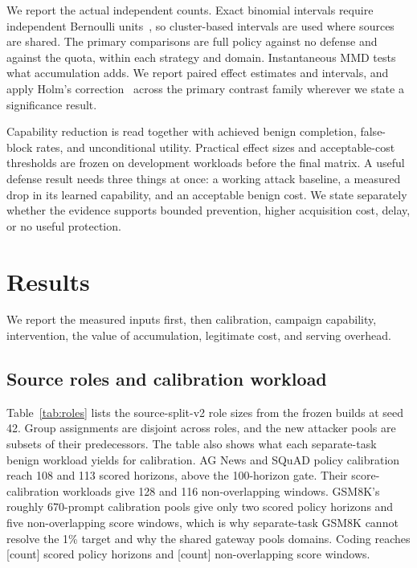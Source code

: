 \documentclass[journal]{IEEEtran}
\newcommand{\tbd}[1]{\textcolor{red!65!black}{[#1]}}
\begin{document}
We report the actual independent counts. Exact binomial intervals require independent Bernoulli units~\cite{clopper1934limits}, so cluster-based intervals are used where sources are shared. The primary comparisons are full policy against no defense and against the quota, within each strategy and domain. Instantaneous MMD tests what accumulation adds. We report paired effect estimates and intervals, and apply Holm's correction~\cite{holm1979simple} across the primary contrast family wherever we state a significance result.

Capability reduction is read together with achieved benign completion, false-block rates, and unconditional utility. Practical effect sizes and acceptable-cost thresholds are frozen on development workloads before the final matrix. A useful defense result needs three things at once: a working attack baseline, a measured drop in its learned capability, and an acceptable benign cost. We state separately whether the evidence supports bounded prevention, higher acquisition cost, delay, or no useful protection.

\section{Results}
\label{sec:results}
We report the measured inputs first, then calibration, campaign capability, intervention, the value of accumulation, legitimate cost, and serving overhead.

\subsection{Source roles and calibration workload}
Table~\ref{tab:roles} lists the source-split-v2 role sizes from the frozen builds at seed 42. Group assignments are disjoint across roles, and the new attacker pools are subsets of their predecessors. The table also shows what each separate-task benign workload yields for calibration. AG News and SQuAD policy calibration reach 108 and 113 scored horizons, above the 100-horizon gate. Their score-calibration workloads give 128 and 116 non-overlapping windows. GSM8K's roughly 670-prompt calibration pools give only two scored policy horizons and five non-overlapping score windows, which is why separate-task GSM8K cannot resolve the 1\% target and why the shared gateway pools domains. Coding reaches \tbd{count} scored policy horizons and \tbd{count} non-overlapping score windows.
\end{document}
